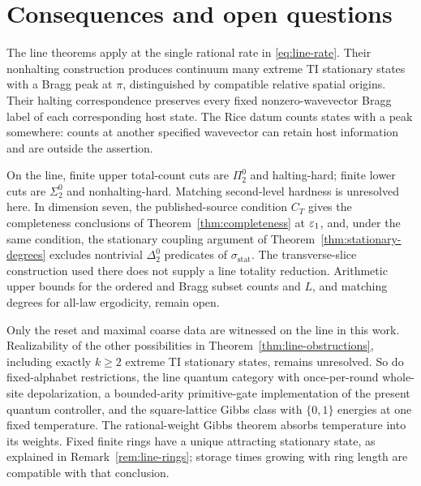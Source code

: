 \section{Consequences and open questions}\label{sec:discussion}
The line theorems apply at the single rational rate in
\eqref{eq:line-rate}. Their nonhalting construction produces continuum many
extreme TI stationary states with a Bragg peak at $\pi$, distinguished by
compatible relative spatial origins. Their halting correspondence preserves
every fixed nonzero-wavevector Bragg label of each corresponding host state.
The Rice datum counts states with a peak somewhere: counts at another
specified wavevector can retain host information and are outside the assertion.

On the line, finite upper total-count cuts are $\Pi^0_2$ and halting-hard;
finite lower cuts are $\Sigma^0_2$ and nonhalting-hard. Matching second-level
hardness is unresolved here. In dimension seven, the published-source
condition $C_T$ gives the completeness conclusions of
Theorem~\ref{thm:completeness} at $\varepsilon_1$, and, under the same condition,
the stationary coupling argument of Theorem~\ref{thm:stationary-degrees}
excludes nontrivial $\Delta^0_2$ predicates of
$\sigma_{\mathrm{stat}}$. The transverse-slice construction used there
does not supply a line totality reduction. Arithmetic upper bounds for
the ordered and Bragg subset counts and $L$, and matching degrees for all-law
ergodicity, remain open.

Only the reset and maximal coarse data are witnessed on the line in this
work. Realizability of the other possibilities in
Theorem~\ref{thm:line-obstructions}, including exactly $k\ge2$ extreme
TI stationary states, remains unresolved. So do fixed-alphabet restrictions,
the line quantum category with once-per-round whole-site depolarization,
a bounded-arity primitive-gate implementation of the present quantum
controller, and the square-lattice Gibbs class with $\{0,1\}$ energies at
one fixed temperature. The rational-weight Gibbs theorem absorbs
temperature into its weights. Fixed finite rings have a unique attracting
stationary state, as explained in Remark~\ref{rem:line-rings}; storage
times growing with ring length are compatible with that conclusion.
